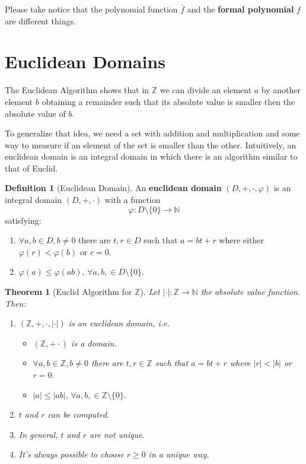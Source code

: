 \documentclass[12pt,a4paper]{article}
\newtheorem{theorem}{Theorem}[section]
\theoremstyle{definition}
\newtheorem{definition}{Definition}[section]
\begin{document}
Please take notice that the polynomial function $\bar{f}$ and the \textbf{formal polynomial} $f$ are different things.

\section{Euclidean Domains}

The Euclidean Algorithm shows that in $\mathbb{Z}$ we can divide an element $a$ by another element $b$ obtaining a remainder such that its absolute value is smaller then the absolute value of $b$. 

To generalize that idea, we need a set with addition and multiplication and some way to measure if an element of the set is smaller than the other. Intuitively, an euclidean domain is an integral domain in which there is an algorithm similar to that of Euclid.

\begin{definition}[Euclidean Domain]
An \textbf{euclidean domain} $(D, +, \cdot, \varphi)$ is an integral domain $(D,+,\cdot)$ with a function \[ \varphi : D \setminus \{0 \} \to \mathbb{N} \] satisfying:
\begin{enumerate}
\item $\forall a,b \in D, b \neq 0$ there are $t, r \in D$ such that $a = bt+r$ where either $\varphi(r) < \varphi(b)$ or $r = 0$.
\item $\varphi(a) \leq \varphi(ab), \, \forall a,b, \in D \setminus \{0\}$.
\end{enumerate}
\end{definition}

\begin{theorem}[Euclid Algorithm for $\mathbb{Z}$]
Let $ | \cdot | :  \mathbb{Z} \to \mathbb{N} $ the absolute value function. Then:
\begin{enumerate}
\item $(\mathbb{Z}, +, \cdot, | \cdot |)$ is an euclidean domain, i.e.
\begin{itemize}
\item $(\mathbb{Z}, + \cdot)$ is a domain.
\item $\forall a,b \in \mathbb{Z}, b \neq 0$ there are $t, r \in \mathbb{Z}$ such that $a = bt+r$ where $|r| < |b|$ or $r = 0$.
\item $|a| \leq |ab|, \, \forall a,b, \in \mathbb{Z} \setminus \{0\}$.
\end{itemize}
\item $t$ and $r$ can be computed.
\item In general, $t$ and $r$ are not unique.
\item It's always possible to choose $r \geq 0$ in a unique way.
\end{enumerate}
\end{theorem}
\end{document}
